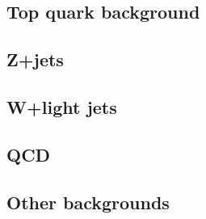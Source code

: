 \subsection{Top quark background}

\subsection{Z+jets}

\subsection{W+light jets}

\subsection{QCD}

\subsection{Other backgrounds}

